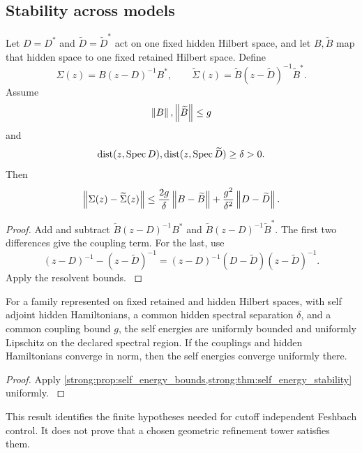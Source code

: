 \subsection{Stability across models}\label{strong:subsec:feshbach_stability}

\begin{theorem}\label{strong:theorem:035}\label{strong:thm:self_energy_stability}
Let \(D=D^*\) and \(\widetilde D=\widetilde D^*\) act on one fixed hidden Hilbert space, and let \(B,\widetilde B\) map that hidden space to one fixed retained Hilbert space. Define
\[
\Sigma(z)=B(z-D)^{-1}B^*,
\qquad
\widetilde\Sigma(z)=\widetilde B(z-\widetilde D)^{-1}\widetilde B^*.
\]
Assume
\[
\left\lVert B\right\rVert,\left\lVert\widetilde B\right\rVert\leq g
\]
and
\[
\operatorname{dist}(z,\operatorname{Spec} D),
\operatorname{dist}(z,\operatorname{Spec}\widetilde D)
\geq\delta>0.
\]
Then
\[
\left\lVert\Sigma(z)-\widetilde\Sigma(z)\right\rVert
\leq
\frac{2g}{\delta}\left\lVert B-\widetilde B\right\rVert
+
\frac{g^2}{\delta^2}\left\lVert D-\widetilde D\right\rVert.
\]
\end{theorem}

\begin{proof}\label{strong:proof:054}
Add and subtract \(\widetilde B(z-D)^{-1}B^*\) and \(\widetilde B(z-D)^{-1}\widetilde B^*\). The first two differences give the coupling term. For the last, use
\[
(z-D)^{-1}-(z-\widetilde D)^{-1}
=(z-D)^{-1}(D-\widetilde D)(z-\widetilde D)^{-1}.
\]
Apply the resolvent bounds.
\label{strong:proof:054:end}\end{proof}

\begin{corollary}\label{strong:corollary:013}\label{strong:cor:uniform_feshbach}
For a family represented on fixed retained and hidden Hilbert spaces, with self adjoint hidden Hamiltonians, a common hidden spectral separation \(\delta\), and a common coupling bound \(g\), the self energies are uniformly bounded and uniformly Lipschitz on the declared spectral region. If the couplings and hidden Hamiltonians converge in norm, then the self energies converge uniformly there.
\end{corollary}

\begin{proof}\label{strong:proof:055}
Apply \cref{strong:prop:self_energy_bounds,strong:thm:self_energy_stability} uniformly.
\label{strong:proof:055:end}\end{proof}

This result identifies the finite hypotheses needed for cutoff independent Feshbach control. It does not prove that a chosen geometric refinement tower satisfies them.

